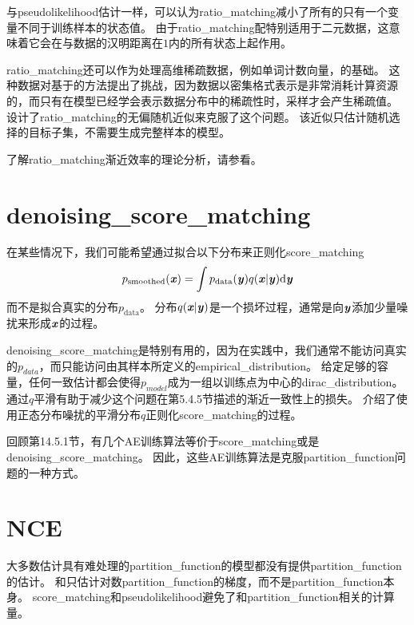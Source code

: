 与\gls{pseudolikelihood}估计一样，可以认为\gls{ratio_matching}减小了所有的只有一个变量不同于训练样本的状态值。
由于\gls{ratio_matching}配特别适用于二元数据，这意味着它会在与数据的汉明距离在$1$内的所有状态上起作用。


\gls{ratio_matching}还可以作为处理高维稀疏数据，例如单词计数向量，的基础。
这种数据对基于的方法提出了挑战，因为数据以密集格式表示是非常消耗计算资源的，而只有在模型已经学会表示数据分布中的稀疏性时，采样才会产生稀疏值。
\cite{Dauphin+Bengio-NIPS2013}设计了\gls{ratio_matching}的无偏随机近似来克服了这个问题。
该近似只估计随机选择的目标子集，不需要生成完整样本的模型。


了解\gls{ratio_matching}渐近效率的理论分析，请参看\cite{Marlin11-small}。


\section{\gls{denoising_score_matching}}
\label{sec:denoising_score_matching}
在某些情况下，我们可能希望通过拟合以下分布来正则化\gls{score_matching}
\begin{equation}
	p_{\text{smoothed}}(\boldsymbol{\mathit{x}}) = \int p_{\text{data}} (\boldsymbol{\mathit{y}}) q( \boldsymbol{\mathit{x}} | \boldsymbol{\mathit{y}}) \mathrm{d} \boldsymbol{\mathit{y}}
\end{equation}
而不是拟合真实的分布$p_{\text{data}}$。
分布$q(\boldsymbol{\mathit{x}} | \boldsymbol{\mathit{y}})$是一个损坏过程，通常是向$\boldsymbol{\mathit{y}}$添加少量噪扰来形成$\boldsymbol{\mathit{x}}$的过程。


\gls{denoising_score_matching}是特别有用的，因为在实践中，我们通常不能访问真实的$p_{data}$，而只能访问由其样本所定义的\gls{empirical_distribution}。
给定足够的容量，任何一致估计都会使得$p_{model}$成为一组以训练点为中心的\gls{dirac_distribution}。
通过$q$平滑有助于减少这个问题在第5.4.5节描述的渐近一致性上的损失。
\cite{Kingma+LeCun-2010}介绍了使用正态分布噪扰的平滑分布$q$正则化\gls{score_matching}的过程。


回顾第14.5.1节，有几个\gls{AE}训练算法等价于\gls{score_matching}或是\gls{denoising_score_matching}。
因此，这些\gls{AE}训练算法是克服\gls{partition_function}问题的一种方式。


\section{\gls{NCE}}
\label{sec:noise_contrastive_estimation}
大多数估计具有难处理的\gls{partition_function}的模型都没有提供\gls{partition_function}的估计。
和只估计对数\gls{partition_function}的梯度，而不是\gls{partition_function}本身。
\gls{score_matching}和\gls{pseudolikelihood}避免了和\gls{partition_function}相关的计算量。 


